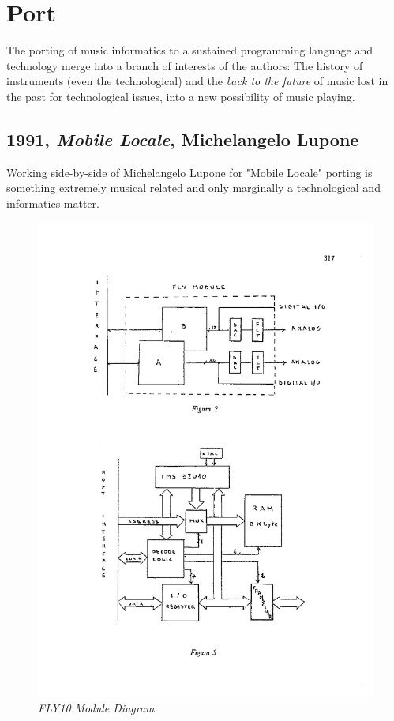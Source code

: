 \documentclass[twoside,a4paper]{article}
\begin{document}

\section{Port}
\label{sec:porting}

The porting of music informatics to a sustained programming language and technology merge into a branch of interests of the authors: The history of instruments (even the technological) and the \emph{back to the future} of music lost in the past for technological issues, into a new possibility of music playing. 


\subsection{1991, \emph{Mobile Locale}, Michelangelo Lupone}

Working side-by-side of Michelangelo Lupone for "Mobile Locale" porting is something extremely musical related and only marginally a technological and informatics matter. 

\begin{figure}[ht]
\centerline{\includegraphics[width=.45\textwidth]{img/lmfly10}}
\caption{\label{ml-fly10}{\it FLY10 Module Diagram}}
\end{figure}
\end{document}
